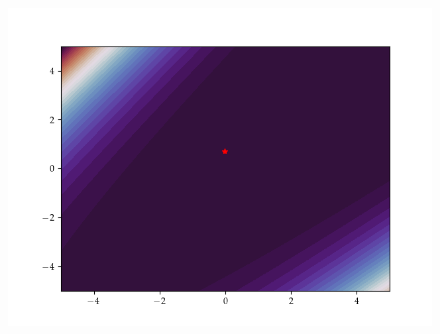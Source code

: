 \begin{figure}[h]
\begin{minipage}[b]{0.32\textwidth}
      \includegraphics[trim=2.5cm 1.3cm 2.5cm 1.3cm,clip,width=\textwidth]{Figures/coco/f9.png}
    \end{minipage}
    

\end{figure}

